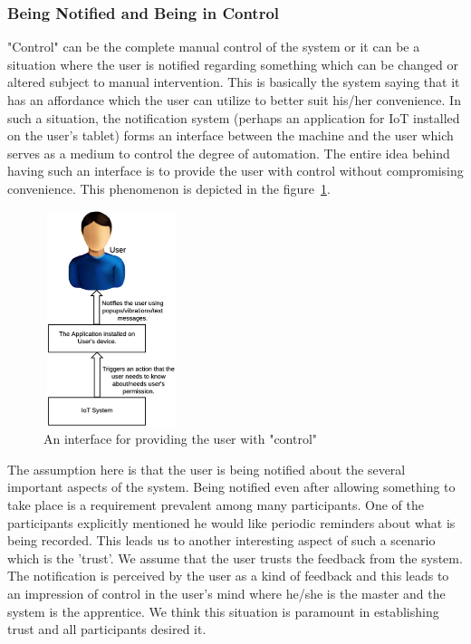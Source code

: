\subsubsection{Being Notified and Being in Control}
"Control" can be the complete manual control of the system or it can be a situation where the user is notified regarding something which can be changed or altered subject to manual intervention. This is basically the system saying that it has an affordance which the user can utilize to better suit his/her convenience. In such a situation, the notification system (perhaps an application for IoT installed on the user's tablet) forms an interface between the machine and the user which serves as a medium to control the degree of automation. The entire idea behind having such an interface is to provide the user with control without compromising convenience. This phenomenon is depicted in the figure~\ref{fig:interface}.
\begin{figure}
	\centering
	\includegraphics[width=4cm, height=6.3cm]{figures/interface.png}
	\caption{An interface for providing the user with "control"}
	\label{fig:interface}
\end{figure}

The assumption here is that the user is being notified about the several important aspects of the system. Being notified even after allowing something to take place is a requirement prevalent among many participants. One of the participants explicitly mentioned he would like periodic reminders about what is being recorded. This leads us to another interesting aspect of such a scenario which is the 'trust'. We assume that the user trusts the feedback from the system. The notification is perceived by the user as a kind of feedback and this leads to an impression of control in the user's mind where he/she is the master and the system is the apprentice. We think this situation is paramount in establishing trust and all participants desired it.


